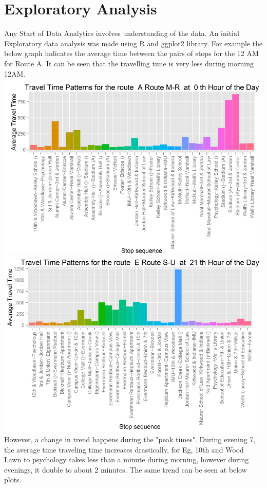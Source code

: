 \documentclass[12pt]{article}\usepackage[]{graphicx}\usepackage[]{color}
\begin{document}
\section{Exploratory Analysis}
Any Start of Data Analytics involves understanding of the data. An initial Exploratory data analysis was made using R and ggplot2 library. For example the below graph indicates the average time between the pairs of stops for the 12 AM for Route A. It can be seen that the travelling time is very less during morning 12AM. \\
\includegraphics[scale=0.4]{resources/ggplot1}\\[1cm] 
\includegraphics[scale=0.4]{resources/ggplot2}\\[1cm] 
However, a change in trend happens during the "peak times". During evening 7, the average time traveling time increases drastically, for Eg, 10th and Wood Lawn to psychology takes less than a minute during morning, however during evenings, it double to about 2 minutes. The same trend can be seen at below plots. \\
\end{document}
